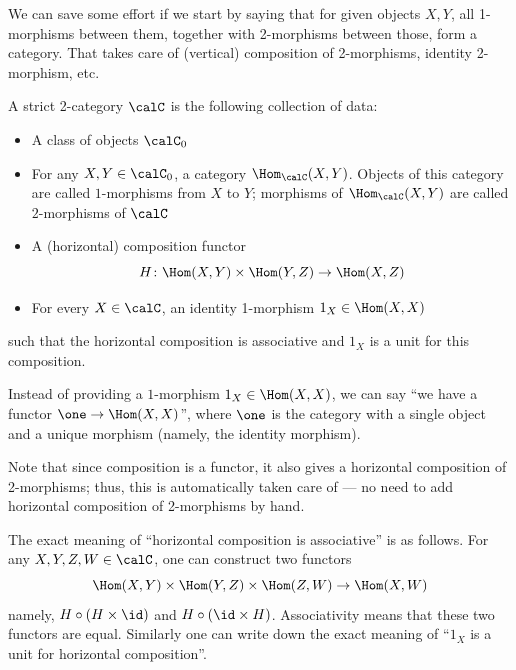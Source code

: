We can save some effort if we start by saying that for given objects
$X,Y$, all 1-morphisms between them, together with 2-morphisms between those,
form a category. That takes care of (vertical) composition of 2-morphisms,
identity 2-morphism, etc.

\begin{definition}\label{d:2-cat-strict}
  A strict 2-category $\calC$ is the following collection of data:
  \begin{itemize}
    \item A class of objects $\calC_0$
    \item For any $X, Y\in \calC_0$, a category $\Hom_{\calC}(X,Y)$. Objects of
      this category are called $1$-morphisms from $X$ to $Y$; morphisms
      of $\Hom_{\calC}(X,Y)$ are called $2$-morphisms of $\calC$
    \item A (horizontal) composition functor
      $$
        H\colon \Hom(X,Y)\times \Hom(Y,Z)\to \Hom(X,Z)
      $$
    \item For every $X\in \calC$, an identity 1-morphism $1_X\in \Hom(X,X)$
  \end{itemize}
  such that the horizontal composition is associative and $1_X$ is a unit
  for this composition.
\end{definition}
Instead of providing a $1$-morphism $1_X\in \Hom(X,X)$, we can say
``we have a functor $\one\to\Hom(X,X)$'', where $\one$ is the category
with a single object and a unique morphism (namely, the identity morphism).

Note that since composition is a functor, it also gives a horizontal
composition of 2-morphisms; thus, this is automatically taken care of --- no
need to add horizontal composition of 2-morphisms by hand.

The exact meaning of ``horizontal composition is associative'' is as follows.
For any $X,Y,Z,W\in \calC$, one can construct two functors
$$
\Hom(X,Y)\times \Hom(Y,Z)\times\Hom(Z,W)\to \Hom(X,W)
$$
namely, $H\circ (H\times \id)$ and $H\circ (\id \times H)$. Associativity
means that these two functors are equal. Similarly one can write down the exact
meaning of ``$1_X$ is a unit for horizontal composition''.

